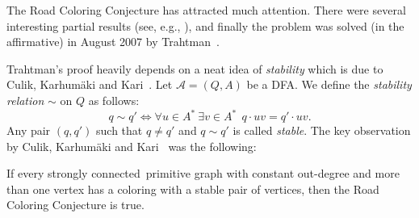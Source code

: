 \documentclass{irmaart}
\newcommand{\scn}{strongly connected}
\theoremstyle{plain}
\begin{document}
The Road Coloring Conjecture has attracted much attention. There were several
interesting partial results (see, e.g.,
\cite{O'Brien:1981,Friedman:1990,Perrin&Schutzenberger:1992,Jonoska&Suen:1995,Carbone:2001,Kari:2002,Kari:2003}),
and finally the problem was solved (in the affirmative) in August 2007 by
Trahtman~\cite{Trahtman:2009}.

Trahtman's proof heavily depends on a neat idea of \emph{stability} which is
due to Culik, Karhum\"aki and Kari~\cite{Culik&Karhumaki&Kari:2002}. Let
$\mathcal{A}=(Q,A)$ be a DFA. We define the \emph{stability
relation} $\sim$ on $Q$ as follows:
$$q\sim q' \Longleftrightarrow\forall u\in A^*\ \exists v\in A^*\ \ q\cdot uv=q'\cdot uv.$$
Any pair $(q,q')$ such that $q\ne q'$ and $q\sim q'$ is called
\emph{stable}. The key observation by Culik, Karhum\"aki and
Kari~\cite{Culik&Karhumaki&Kari:2002} was the following:

\begin{proposition}
\label{KV:prop:ckk} If every \scn\ primitive graph with constant out-degree and
more than one vertex has a coloring with a stable pair of vertices, then the
Road Coloring Conjecture is true.
\end{proposition}
\end{document}

